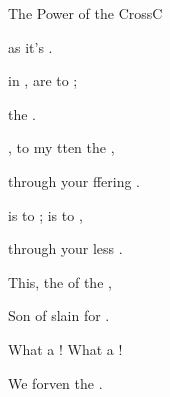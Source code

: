 \documentclass[12pt]{book}
\begin{document}
\begin{song}{The Power of the Cross}{C}{}{}{}{}
\begin{SBExtraKeys}
{\begin{SBVerse}
         as it's 
              .

          in , 
             are  to ;

         the  .

    \end{SBVerse}

    \begin{SBVerse}
        
        , to  my  
            tten  the , 

         through your ffering 
              .

         is  to ;
             is  to ,

         through your less .

    \end{SBVerse}

    \begin{SBChorus}

        This, the  of the ,

        Son of  slain for .

        What a ! What a !

        We  forven  the . 
            \Ch{[Em}{}  \Ch{C]}{}

    \end{SBChorus}
}\end{SBExtraKeys}
\end{song}
\end{document}
